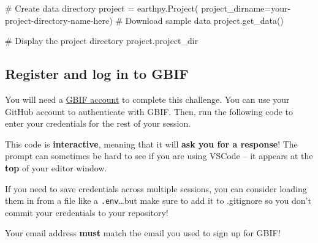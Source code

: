 \documentclass[
  letterpaper,
  DIV=11,
  numbers=noendperiod,
  oneside]{scrreprt}
\newenvironment{Shaded}{\begin{snugshade}}{\end{snugshade}}
\newcommand{\CommentTok}[1]{\textcolor[rgb]{0.37,0.37,0.37}{#1}}
\newcommand{\NormalTok}[1]{\textcolor[rgb]{0.00,0.23,0.31}{#1}}
\newcommand{\OperatorTok}[1]{\textcolor[rgb]{0.37,0.37,0.37}{#1}}
\newcommand{\StringTok}[1]{\textcolor[rgb]{0.13,0.47,0.30}{#1}}
\begin{document}
\begin{Shaded}
\begin{Highlighting}[]
\CommentTok{\# Create data directory}
\NormalTok{project }\OperatorTok{=}\NormalTok{ earthpy.Project(}
\NormalTok{    project\_dirname}\OperatorTok{=}\StringTok{\textquotesingle{}your{-}project{-}directory{-}name{-}here\textquotesingle{}}\NormalTok{)}
\CommentTok{\# Download sample data}
\NormalTok{project.get\_data()}

\CommentTok{\# Display the project directory}
\NormalTok{project.project\_dir}
\end{Highlighting}
\end{Shaded}

\subsection{Register and log in to
GBIF}\label{register-and-log-in-to-gbif}

You will need a \href{https://www.gbif.org/}{GBIF account} to complete
this challenge. You can use your GitHub account to authenticate with
GBIF. Then, run the following code to enter your credentials for the
rest of your session.

This code is \textbf{interactive}, meaning that it will \textbf{ask you
for a response}! The prompt can sometimes be hard to see if you are
using VSCode -- it appears at the \textbf{top} of your editor window.

\begin{tcolorbox}[enhanced jigsaw, colbacktitle=quarto-callout-tip-color!10!white, opacityback=0, bottomtitle=1mm, toptitle=1mm, bottomrule=.15mm, left=2mm, colframe=quarto-callout-tip-color-frame, leftrule=.75mm, opacitybacktitle=0.6, colback=white, rightrule=.15mm, toprule=.15mm, breakable, titlerule=0mm, title=\textcolor{quarto-callout-tip-color}{\faLightbulb}\hspace{0.5em}{Tip}, coltitle=black, arc=.35mm]

If you need to save credentials across multiple sessions, you can
consider loading them in from a file like a \texttt{.env}\ldots but make
sure to add it to .gitignore so you don't commit your credentials to
your repository!

\end{tcolorbox}

\begin{tcolorbox}[enhanced jigsaw, colbacktitle=quarto-callout-warning-color!10!white, opacityback=0, bottomtitle=1mm, toptitle=1mm, bottomrule=.15mm, left=2mm, colframe=quarto-callout-warning-color-frame, leftrule=.75mm, opacitybacktitle=0.6, colback=white, rightrule=.15mm, toprule=.15mm, breakable, titlerule=0mm, title=\textcolor{quarto-callout-warning-color}{\faExclamationTriangle}\hspace{0.5em}{Warning}, coltitle=black, arc=.35mm]

Your email address \textbf{must} match the email you used to sign up for
GBIF!

\end{tcolorbox}
\end{document}
